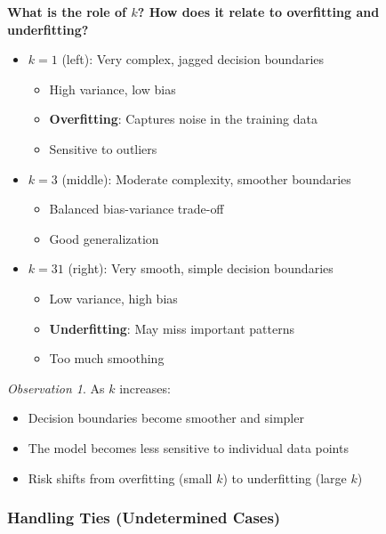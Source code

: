 \documentclass[11pt,a4paper]{article}
\theoremstyle{definition}
\theoremstyle{plain}
\theoremstyle{remark}
\newtheorem*{observation}{Observation}
\begin{document}
\begin{center}
\colorbox{cyan!15}{\parbox{0.9\textwidth}{
\textbf{What is the role of $k$? How does it relate to overfitting and underfitting?}
}}
\end{center}

\begin{itemize}
    \item \textbf{$k=1$} (left): Very complex, jagged decision boundaries
    \begin{itemize}
        \item High variance, low bias
        \item \textbf{Overfitting}: Captures noise in the training data
        \item Sensitive to outliers
    \end{itemize}
    
    \item \textbf{$k=3$} (middle): Moderate complexity, smoother boundaries
    \begin{itemize}
        \item Balanced bias-variance trade-off
        \item Good generalization
    \end{itemize}
    
    \item \textbf{$k=31$} (right): Very smooth, simple decision boundaries
    \begin{itemize}
        \item Low variance, high bias
        \item \textbf{Underfitting}: May miss important patterns
        \item Too much smoothing
    \end{itemize}
\end{itemize}

\begin{observation}
As $k$ increases:
\begin{itemize}
    \item Decision boundaries become smoother and simpler
    \item The model becomes less sensitive to individual data points
    \item Risk shifts from overfitting (small $k$) to underfitting (large $k$)
\end{itemize}
\end{observation}

\subsubsection{Handling Ties (Undetermined Cases)}
\end{document}
